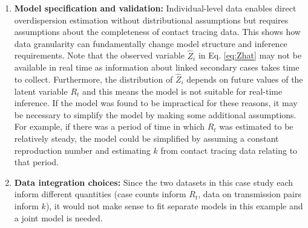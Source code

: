 \documentclass{article}
\begin{document}
\begin{enumerate}
    \item \textbf{Model specification and validation:} Individual-level data enables direct overdispersion estimation without distributional assumptions but requires assumptions about the completeness of contact tracing data. This shows how data granularity can fundamentally change model structure and inference requirements. Note that the observed variable $\hat{Z}_i$ in Eq. \eqref{eq:Zhat} may not be available in real time as information about linked secondary cases takes time to collect. Furthermore, the distribution of $\hat{Z}_i$ depends on future values of the latent variable $R_t$ and this means the model is not suitable for real-time inference. If the model was found to be impractical for these reasons, it may be necessary to simplify the model by making some additional assumptions. For example, if there was a period of time in which $R_t$ was estimated to be relatively steady, the model could be simplified by assuming a constant reproduction number and estimating $k$ from contact tracing data relating to that period. 

    \item \textbf{Data integration choices:} Since the two datasets in this case study each inform different quantities (case counts inform $R_t$, data on transmission pairs inform $k$), it would not make sense to fit separate models in this example and a joint model is needed. 
\end{enumerate}
\end{document}

